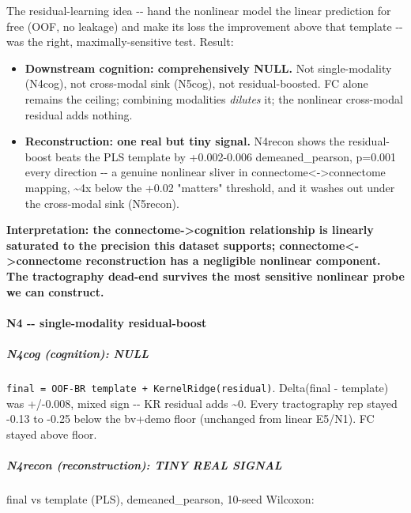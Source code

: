 The residual-learning idea -\/- hand the nonlinear model the linear prediction for free (OOF, no leakage) and make its loss the improvement above that template -\/- was the right, maximally-sensitive test. Result:

\begin{itemize}
\tightlist
\item
  \textbf{Downstream cognition: comprehensively NULL.} Not single-modality (N4cog), not cross-modal sink (N5cog), not residual-boosted. FC alone remains the ceiling; combining modalities \emph{dilutes} it; the nonlinear cross-modal residual adds nothing.
\item
  \textbf{Reconstruction: one real but tiny signal.} N4recon shows the residual-boost beats the PLS template by +0.002-0.006 demeaned\_pearson, p=0.001 every direction -\/- a genuine nonlinear sliver in connectome\textless-\textgreater connectome mapping, \textasciitilde4x below the +0.02 "matters" threshold, and it washes out under the cross-modal sink (N5recon).
\end{itemize}

\textbf{Interpretation: the connectome-\textgreater cognition relationship is linearly saturated to the precision this dataset supports; connectome\textless-\textgreater connectome reconstruction has a negligible nonlinear component. The tractography dead-end survives the most sensitive nonlinear probe we can construct.}

\paragraph{N4 -\/- single-modality residual-boost}\label{n4----single-modality-residual-boost}

\subparagraph{N4cog (cognition): NULL}\label{n4cog-cognition-null}

\texttt{final\ =\ OOF-BR\ template\ +\ KernelRidge(residual)}. Delta(final - template) was +/-0.008, mixed sign -\/- KR residual adds \textasciitilde0. Every tractography rep stayed -0.13 to -0.25 below the bv+demo floor (unchanged from linear E5/N1). FC stayed above floor.

\subparagraph{N4recon (reconstruction): TINY REAL SIGNAL}\label{n4recon-reconstruction-tiny-real-signal}

final vs template (PLS), demeaned\_pearson, 10-seed Wilcoxon:

